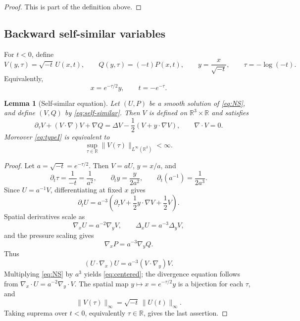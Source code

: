 \documentclass[11pt]{amsart}
\theoremstyle{plain}
\newtheorem{lemma}[theorem]{Lemma}
\theoremstyle{definition}
\theoremstyle{remark}
\numberwithin{equation}{section}
\begin{document}
\begin{proof}
This is part of the definition above.
\end{proof}

\subsection{Backward self-similar variables}

For \(t<0\), define
\begin{equation}\label{eq:self-similar}
   V(y,\tau)=\sqrt{-t}\,U(x,t),\qquad
   Q(y,\tau)=(-t)P(x,t),\qquad
   y=\frac{x}{\sqrt{-t}},\qquad
   \tau=-\log(-t).
\end{equation}
Equivalently,
\[
   x=e^{-\tau/2}y,\qquad t=-e^{-\tau}.
\]

\begin{lemma}[Self-similar equation]\label{lem:self-similar-equation}
Let \((U,P)\) be a smooth solution of \eqref{eq:NS}, and define \((V,Q)\) by
\eqref{eq:self-similar}.  Then \(V\) is defined on
\(\mathbb R^3\times\mathbb R\) and satisfies
\begin{equation}\label{eq:centered}
   \partial_\tau V+(V\cdot\nabla)V+\nabla Q
   =
   \Delta V-\frac12(V+y\cdot\nabla V),
   \qquad \nabla\cdot V=0.
\end{equation}
Moreover \eqref{eq:typeI} is equivalent to
\[
   \sup_{\tau\in\mathbb R}
   \|V(\tau)\|_{L^\infty(\mathbb R^3)}<\infty .
\]
\end{lemma}

\begin{proof}
Let \(a=\sqrt{-t}=e^{-\tau/2}\).  Then \(V=aU\), \(y=x/a\), and
\[
   \partial_t\tau=\frac1{-t}=\frac1{a^2},
   \qquad
   \partial_t y=\frac{y}{2a^2},
   \qquad
   \partial_t(a^{-1})=\frac1{2a^3}.
\]
Since \(U=a^{-1}V\), differentiating at fixed \(x\) gives
\[
   \partial_tU
   =
   a^{-3}
   \left(
      \partial_\tau V+\frac12 y\cdot\nabla V+\frac12V
   \right).
\]
Spatial derivatives scale as
\[
   \nabla_xU=a^{-2}\nabla_yV,\qquad
   \Delta_xU=a^{-3}\Delta_yV,
\]
and the pressure scaling gives
\[
   \nabla_xP=a^{-3}\nabla_yQ.
\]
Thus
\[
   (U\cdot\nabla_x)U=a^{-3}(V\cdot\nabla_y)V.
\]
Multiplying \eqref{eq:NS} by \(a^3\) yields \eqref{eq:centered}; the
divergence equation follows from
\(\nabla_x\cdot U=a^{-2}\nabla_y\cdot V\).  The spatial map
\(y\mapsto x=e^{-\tau/2}y\) is a bijection for each \(\tau\), and
\[
   \|V(\tau)\|_\infty
   =
   \sqrt{-t}\,\|U(t)\|_\infty .
\]
Taking suprema over \(t<0\), equivalently \(\tau\in\mathbb R\), gives the
last assertion.
\end{proof}
\end{document}
